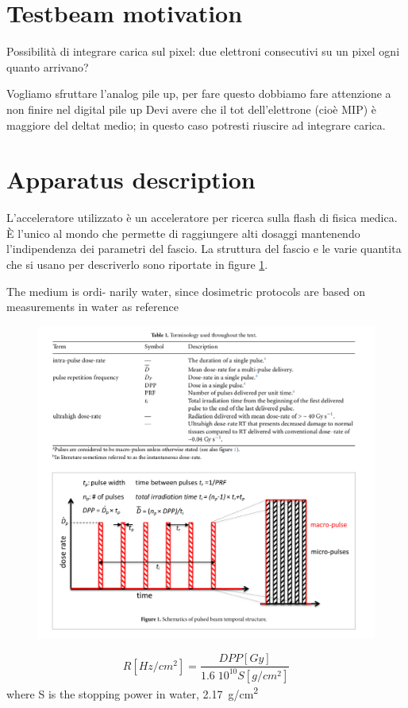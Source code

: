 \section{Testbeam motivation}
Possibilità di integrare carica sul pixel: due elettroni consecutivi su un pixel ogni quanto arrivano?

Vogliamo sfruttare l'analog pile up, per fare questo dobbiamo fare attenzione a non finire nel digital pile up
Devi avere che il tot dell'elettrone (cioè MIP) è maggiore del deltat medio; in questo caso potresti riuscire ad integrare carica.


\section{Apparatus description}
L'acceleratore utilizzato è un acceleratore per ricerca sulla flash di fisica medica. È l'unico al mondo che permette di raggiungere alti dosaggi mantenendo l'indipendenza dei parametri del fascio. La struttura del fascio e le varie quantita che si usano per descriverlo sono riportate in figure \ref{fig:}.

The medium is ordi-
narily water, since dosimetric protocols are based on measurements in
water as reference

\begin{figure}
    \centering
    \includegraphics[width=.98\linewidth]{figures/test_beam/dose_param.png}
    \caption{}
    \label{fig:}
 \end{figure}


 \begin{equation}
    R[Hz/cm^2] = \frac{DPP[Gy]}{1.6 \;10^{10} S[g/cm^2]}
 \end{equation}
 where S is the stopping power in water, \SI{2.17}{g/cm\squared}



